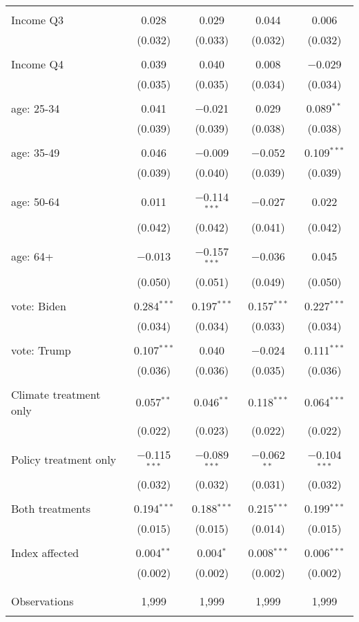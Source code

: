\begin{tabular}{@{\extracolsep{5pt}}lcccc}
  & & & & \\ 
 Income Q3 & 0.028 & 0.029 & 0.044 & 0.006 \\ 
  & (0.032) & (0.033) & (0.032) & (0.032) \\ 
  & & & & \\ 
 Income Q4 & 0.039 & 0.040 & 0.008 & $-$0.029 \\ 
  & (0.035) & (0.035) & (0.034) & (0.034) \\ 
  & & & & \\ 
 age: 25-34 & 0.041 & $-$0.021 & 0.029 & 0.089$^{**}$ \\ 
  & (0.039) & (0.039) & (0.038) & (0.038) \\ 
  & & & & \\ 
 age: 35-49 & 0.046 & $-$0.009 & $-$0.052 & 0.109$^{***}$ \\ 
  & (0.039) & (0.040) & (0.039) & (0.039) \\ 
  & & & & \\ 
 age: 50-64 & 0.011 & $-$0.114$^{***}$ & $-$0.027 & 0.022 \\ 
  & (0.042) & (0.042) & (0.041) & (0.042) \\ 
  & & & & \\ 
 age: 64+ & $-$0.013 & $-$0.157$^{***}$ & $-$0.036 & 0.045 \\ 
  & (0.050) & (0.051) & (0.049) & (0.050) \\ 
  & & & & \\ 
 vote: Biden & 0.284$^{***}$ & 0.197$^{***}$ & 0.157$^{***}$ & 0.227$^{***}$ \\ 
  & (0.034) & (0.034) & (0.033) & (0.034) \\ 
  & & & & \\ 
 vote: Trump & 0.107$^{***}$ & 0.040 & $-$0.024 & 0.111$^{***}$ \\ 
  & (0.036) & (0.036) & (0.035) & (0.036) \\ 
  & & & & \\ 
 Climate treatment only & 0.057$^{**}$ & 0.046$^{**}$ & 0.118$^{***}$ & 0.064$^{***}$ \\ 
  & (0.022) & (0.023) & (0.022) & (0.022) \\ 
  & & & & \\ 
 Policy treatment only & $-$0.115$^{***}$ & $-$0.089$^{***}$ & $-$0.062$^{**}$ & $-$0.104$^{***}$ \\ 
  & (0.032) & (0.032) & (0.031) & (0.032) \\ 
  & & & & \\ 
 Both treatments & 0.194$^{***}$ & 0.188$^{***}$ & 0.215$^{***}$ & 0.199$^{***}$ \\ 
  & (0.015) & (0.015) & (0.014) & (0.015) \\ 
  & & & & \\ 
 Index affected & 0.004$^{**}$ & 0.004$^{*}$ & 0.008$^{***}$ & 0.006$^{***}$ \\ 
  & (0.002) & (0.002) & (0.002) & (0.002) \\ 
  & & & & \\ 
\hline \\[-1.8ex] 

Observations & 1,999 & 1,999 & 1,999 & 1,999 \\ 
\hline 
\hline \\[-1.8ex] 
\end{tabular} 
